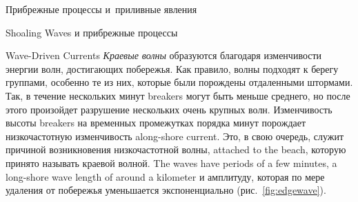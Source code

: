 \begin{chapter}{Прибрежные процессы и~приливные явления}
\begin{section}{Shoaling Waves и прибрежные процессы}
\begin{paragraph}{Wave-Driven Currents}
\emph{Краевые волны} образуются благодаря
изменчивости энергии волн, достигающих побережья. Как правило, волны подходят
к берегу группами, особенно те из них, которые были порождены отдаленными
штормами. Так, в течение нескольких минут 
breakers могут быть меньше среднего, но
после этого произойдет разрушение нескольких очень крупных волн.
Изменчивость высоты breakers на временных промежутках порядка минут
порождает низкочастотную изменчивость along-shore current. 
Это, в свою очередь, служит причиной возникновения низкочастотной волны,
attached to the beach, которую принято называть краевой волной. 
The waves have periods of a few
minutes, a long-shore wave length of around a kilometer 
и амплитуду, которая по мере удаления от побережья уменьшается 
экспоненциально (рис.~\ref{fig:edgewave}).
%
\end{paragraph}


\end{section}
\end{chapter}
